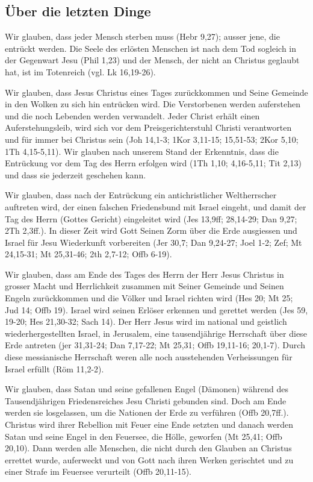 \subsection{Über die letzten Dinge}
Wir glauben, dass jeder Mensch sterben muss (Hebr 9,27); ausser jene, die entrückt werden. Die Seele des erlösten Menschen ist nach dem Tod sogleich in der Gegenwart Jesu (Phil 1,23) und der Mensch, der nicht an Christus geglaubt hat, ist im Totenreich (vgl. Lk 16,19-26).

Wir glauben, dass Jesus Christus eines Tages zurückkommen und Seine Gemeinde in den Wolken zu sich hin entrücken wird. Die Verstorbenen werden auferstehen und die noch Lebenden werden verwandelt. Jeder Christ erhält einen Auferstehungsleib, wird sich vor dem Preisgerichterstuhl Christi verantworten und für immer bei Christus sein (Joh 14,1-3; 1Kor 3,11-15; 15,51-53; 2Kor 5,10; 1Th 4,15-5,11). Wir glauben nach unserem Stand der Erkenntnis, dass die Entrückung vor dem Tag des Herrn erfolgen wird (1Th 1,10; 4,16-5,11; Tit 2,13) und dass sie jederzeit geschehen kann.

Wir glauben, dass nach der Entrückung ein antichristlicher Weltherrscher auftreten wird, der einen falschen Friedensbund mit Israel eingeht, und damit der Tag des Herrn (Gottes Gericht) eingeleitet wird (Jes 13,9ff; 28,14-29; Dan 9,27; 2Th 2,3ff.). In dieser Zeit wird Gott Seinen Zorm über die Erde ausgiessen und Israel für Jesu Wiederkunft vorbereiten (Jer 30,7; Dan 9,24-27; Joel 1-2; Zef; Mt 24,15-31; Mt 25,31-46; 2th 2,7-12; Offb 6-19).

Wir glauben, dass am Ende des Tages des Herrn der Herr Jesus Christus in grosser Macht und Herrlichkeit zusammen mit Seiner Gemeinde und Seinen Engeln zurückkommen und die Völker und Israel richten wird (Hes 20; Mt 25; Jud 14; Offb 19). Israel wird seinen Erlöser erkennen und gerettet werden (Jes 59, 19-20; Hes 21,30-32; Sach 14). Der Herr Jesus wird im national und geistlich wiederhergestellten Israel, in Jerusalem, eine tausendjährige Herrschaft über diese Erde antreten (jer 31,31-24; Dan 7,17-22; Mt 25,31; Offb 19,11-16; 20,1-7). Durch diese messianische Herrschaft weren alle noch ausstehenden Verheissungen für Israel erfüllt (Röm 11,2-2).

Wir glauben, dass Satan und seine gefallenen Engel (Dämonen) während des Tausendjährigen Friedensreiches Jesu Christi gebunden sind. Doch am Ende werden sie losgelassen, um die Nationen der Erde zu verführen (Offb 20,7ff.). Christus wird ihrer Rebellion mit Feuer eine Ende setzten und danach werden Satan und seine Engel in den Feuersee, die Hölle, geworfen (Mt 25,41; Offb 20,10). Dann werden alle Menschen, die nicht durch den Glauben an Christus errettet wurde, auferweckt und von Gott nach ihren Werken gerischtet und zu einer Strafe im Feuersee verurteilt (Offb 20,11-15).

